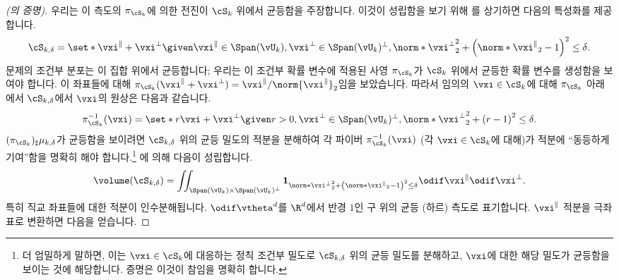 \documentclass[../../book-main_ko.tex]{subfiles}
\begin{document}
\begin{proof}[(의 증명)]
    우리는 이 측도의 \(\pi_{\cS_k}\)에 의한 전진이 \(\cS_k\) 위에서 균등함을 주장합니다.
    이것이 성립함을 보기 위해 를 상기하면 다음의 특성화를 제공합니다.
    \begin{equation}
        \cS_{k, \delta} = \set*{
            \vxi^{\|} + \vxi^{\perp}
            \given
            \vxi^{\|} \in \Span(\vU_k),
            \vxi^{\perp} \in \Span(\vU_k)^\perp,
            \norm*{\vxi^{\perp}}_2^2
            + \left( \norm*{\vxi^{\|}}_2 - 1 \right)^2
            \leq
            \delta
        }.
    \end{equation}
    문제의 조건부 분포는 이 집합 위에서 균등합니다; 우리는 이 조건부 확률 변수에 적용된 사영 \(\pi_{\cS_k}\)가 \(\cS_k\) 위에서 균등한 확률 변수를 생성함을 보여야 합니다.
    이 좌표들에 대해 \(\pi_{\cS_k}(\vxi^\| + \vxi^\perp) = \vxi^\| / \norm{\vxi^{\|}}_2\)임을 보았습니다.
    따라서 임의의 \(\vxi \in \cS_{k}\)에 대해 \(\pi_{\cS_k}\) 아래에서 \(\cS_{k, \delta}\)에서 \(\vxi\)의 원상은 다음과 같습니다.
    \begin{equation}
        \pi_{\cS_k}^{-1}(\vxi) = \set*{
            r\vxi + \vxi^\perp
            \given
            r > 0,
            \vxi^{\perp} \in \Span(\vU_k)^\perp,
            \norm*{\vxi^{\perp}}_2^2
            + \left( r - 1 \right)^2
            \leq
            \delta
        }.
        \label{eq:fiber-of-uos}
    \end{equation}
    \((\pi_{\cS_k})_{\sharp} \mu_{k, \delta}\)가 균등함을 보이려면 \(\cS_{k, \delta}\) 위의 균등 밀도의 적분을 분해하여 각 파이버 \(\pi_{\cS_k}^{-1}(\vxi)\) (각 \(\vxi \in \cS_k\)에 대해)가 적분에 ``동등하게 기여''함을 명확히 해야 합니다.\footnote{더 엄밀하게 말하면, 이는 \(\vxi \in \cS_{k}\)에 대응하는 정칙 조건부 밀도로 \(\cS_{k, \delta}\) 위의 균등 밀도를 분해하고, \(\vxi\)에 대한 해당 밀도가 균등함을 보이는 것에 해당합니다. 증명은 이것이 참임을 명확히 합니다.}
    에 의해 다음이 성립합니다.
    \begin{equation}
        \volume(\cS_{k, \delta})
        = \iint_{\Span(\vU_k) \times \Span(\vU_k)^\perp} \mathbf{1}_{
            \norm*{\vxi^{\perp}}_2^2
            + \left( \norm*{\vxi^{\|}}_2 - 1 \right)^2
            \leq
            \delta
        }
        \odif \vxi^{\|} \odif \vxi^{\perp}.
    \end{equation}
    특히 직교 좌표들에 대한 적분이 인수분해됩니다.
    \(\odif \vtheta^{d}\)를 \(\R^d\)에서 반경 \(1\)인 구 위의 균등 (하르) 측도로 표기합니다. \(\vxi^{\|}\) 적분을 극좌표로 변환하면 다음을 얻습니다.

\end{proof}
\end{document}
